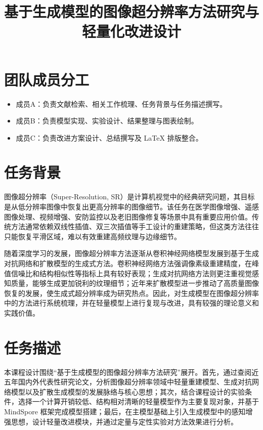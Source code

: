 \documentclass[bwprint]{report}
\title{基于生成模型的图像超分辨率方法研究与轻量化改进设计}
\begin{document}
 \maketitle

\pagestyle{plain}
\tableofcontents
\newpage
\pagestyle{plain}

\setcounter{page}{1}


\section{团队成员分工}
\begin{itemize}
    \item 成员A：负责文献检索、相关工作梳理、任务背景与任务描述撰写。
    \item 成员B：负责模型实现、实验设计、结果整理与图表绘制。
    \item 成员C：负责改进方案设计、总结撰写及 \LaTeX{} 排版整合。
\end{itemize}



\section{任务背景}
图像超分辨率（Super-Resolution, SR）是计算机视觉中的经典研究问题，其目标是从低分辨率图像中恢复出更高分辨率的图像细节。该任务在医学图像增强、遥感图像处理、视频增强、安防监控以及老旧图像修复等场景中具有重要应用价值。传统方法通常依赖双线性插值、双三次插值等手工设计的重建策略，但这类方法往往只能恢复平滑区域，难以有效重建高频纹理与边缘细节。

随着深度学习的发展，图像超分辨率方法逐渐从卷积神经网络模型发展到基于生成对抗网络和扩散模型的生成式方法。卷积神经网络方法强调像素级重建精度，在峰值信噪比和结构相似性等指标上具有较好表现；生成对抗网络方法则更注重视觉感知质量，能够生成更加锐利的纹理细节；近年来扩散模型进一步推动了高质量图像恢复的发展，使生成式超分辨率成为研究热点。因此，对生成模型在图像超分辨率中的方法进行系统梳理，并在轻量模型上进行复现与改进，具有较强的理论意义和实践价值。

\section{任务描述}
本课程设计围绕“基于生成模型的图像超分辨率方法研究”展开。首先，通过查阅近五年国内外代表性研究论文，分析图像超分辨率领域中轻量重建模型、生成对抗网络模型以及扩散生成模型的发展脉络与核心思想；其次，结合课程设计的实验条件，选择一个计算开销较低、结构相对清晰的轻量模型作为主要复现对象，并基于 MindSpore 框架完成模型搭建；最后，在主模型基础上引入生成模型中的感知增强思想，设计轻量改进模块，并通过定量与定性实验对方法效果进行分析。
\end{document}
